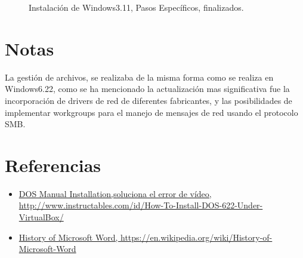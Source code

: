 \documentclass[paper=a4, fontsize=12pt]{article} 		%
\numberwithin{equation}{section}						%
\numberwithin{table}{section} 							%
\begin{document}
\begin{figure}[H]
{{        }}
        \hfill
	\caption{Instalación de Windows3.11, Pasos Específicos, finalizados.}
\end{figure}
\section{Notas}
La gestión de archivos, se realizaba de la misma forma como se realiza en Windows6.22, como se ha mencionado la actualización mas significativa fue la incorporación de drivers de red de diferentes fabricantes, y las posibilidades de implementar workgroups para el manejo de mensajes de red usando el protocolo SMB.
\section{Referencias}
\begin{itemize}
\item  \hyperref[http://www.instructables.com/id/How-To-Install-DOS-622-Under-VirtualBox/]{DOS Manual Installation,soluciona el error de vídeo,  http://www.instructables.com/id/How-To-Install-DOS-622-Under-VirtualBox/}
\item  \hyperref[https://en.wikipedia.org/wiki/History_of_Microsoft_Word]{History of Microsoft Word, https://en.wikipedia.org/wiki/History-of-Microsoft-Word  }
\end{itemize}
\end{document}

